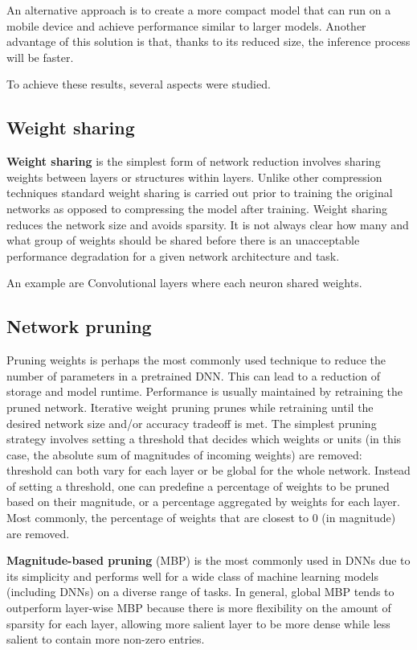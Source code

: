 An alternative approach is to create a more compact model that can run on a mobile device and
achieve performance similar to larger models. Another advantage of this solution is that,
thanks to its reduced size, the inference process will be faster.

To achieve these results, several aspects were studied.
\subsection{Weight sharing}
\textbf{Weight sharing} is the simplest form of network reduction involves sharing weights between
layers or structures within layers. Unlike other compression techniques standard weight sharing is
carried out prior to training the original networks as opposed to compressing the model after
training. Weight sharing reduces the network size and avoids sparsity. It is not always clear how
many and what group of weights should be shared before there is an unacceptable performance
degradation for a given network architecture and task.

\begin{esempio}
    An example are Convolutional layers where each neuron shared weights.
\end{esempio}

\subsection{Network pruning}
Pruning weights is perhaps the most commonly used technique to reduce the number of parameters in a
pretrained DNN. This can lead to a reduction of storage and model runtime. Performance is usually
maintained by retraining the pruned network. Iterative weight pruning prunes while retraining until
the desired network size and/or accuracy tradeoff is met. The simplest pruning strategy involves
setting a threshold that decides which weights or units (in this case, the absolute sum of magnitudes
of incoming weights) are removed: threshold can both vary for each layer or be global for the whole
network. Instead of setting a threshold, one can predefine a percentage of weights to be pruned based
on their magnitude, or a percentage aggregated by weights for each layer. Most commonly, the percentage
of weights that are closest to 0 (in magnitude) are removed.

\textbf{Magnitude-based pruning} (MBP) is the most commonly used in DNNs due to its simplicity and
performs well for a wide class of machine learning models (including DNNs) on a diverse range of tasks.
In general, global MBP tends to outperform layer-wise MBP because there is more flexibility on the
amount of sparsity for each layer, allowing more salient layer to be more dense while less salient
to contain more non-zero entries.

